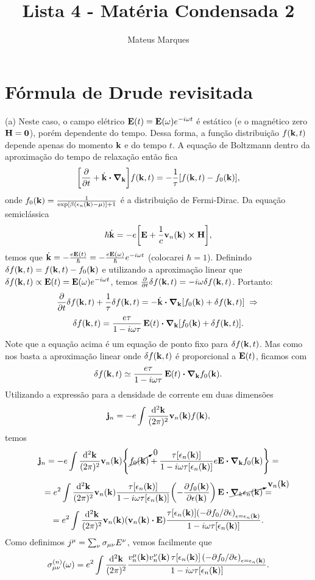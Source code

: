 \documentclass[a4paper,10pt]{article}
\title{\Huge{\textbf{Lista 4 - Matéria Condensada 2}}}
\author{Mateus Marques}
\begin{document}
\maketitle

\section{Fórmula de Drude revisitada}

(a) Neste caso, o campo elétrico $\vb{E}(t) = \vb{E}(\omega) e^{-i\omega t}$ é estático (e o magnético zero $\vb{H}=\vb{0}$), porém dependente do tempo. Dessa forma, a função distribuição $f(\vb{k}, t)$ depende apenas do momento $\vb{k}$ e do tempo $t$. A equação de Boltzmann dentro da aproximação do tempo de relaxação então fica
$$
\qty[\pdv{t} + \dot{\k} \vdot \grad_{\k}] f(\k, t) =
-\frac{1}{\tau} \qty[f(\k,t) - f_0(\k)],
$$
onde $f_0(\vb{k}) = \frac{1}{\exp[\beta(\epsilon_n(\vb{k})-\mu)] + 1}$ é a distribuição de Fermi-Dirac. Da equação semiclássica
$$
\hbar \dot{\k} = -e \qty[\E + \frac{1}{c} \v_n(\k) \cp \vb{H}],
$$
temos que $\dot{\vb{k}} = - \frac{e \vb{E}(t)}{\hbar} = -\frac{e \vb{E}(\omega)}{\hbar} e^{-i\omega t}$ (colocarei $\hbar=1$). Definindo $\delta f(\vb{k},t) = f(\vb{k},t) - f_0(\vb{k})$ e utilizando a aproximação linear que $\delta f(\vb{k},t) \propto \vb{E}(t) = \vb{E}(\omega) e^{-i\omega t}$, temos $\pdv{t} \delta f(\vb{k},t) = - i\omega \delta f(\vb{k},t)$. Portanto:
$$
\pdv{t}\delta f(\k,t) + \frac{1}{\tau} \delta f(\k, t) =  - \dot{\k} \vdot \grad_{\k}  [f_0(\k) + \delta f(\k, t) ] \implies
$$
$$
\delta f(\k,t) = \frac{e \tau}{1-i\omega \tau} \, \E(t) \vdot \grad_{\k}  [ f_0(\k) + \delta f(\k, t) ].
$$
Note que a equação acima é um equação de ponto fixo para $\delta f(\vb{k},t)$. Mas como nos basta a aproximação linear onde $\delta f(\vb{k},t)$ é proporcional a $\vb{E}(t)$, ficamos com
$$
\delta f(\k,t) \simeq \frac{e \tau}{1-i\omega \tau} \, \E(t) \vdot \grad_{\k}  f_0(\k).
$$
Utilizando a expressão para a densidade de corrente em duas dimensões
$$
\vb{j}_n = -e \int \frac{\dd[2]{\vb{k}}}{(2\pi)^2} \vb{v}_n(\vb{k}) f(\vb{k}),
$$
temos
$$
\vb{j}_n = -e \int \frac{\dd[2]{\k}}{(2\pi)^2} \v_n(\k)
\qty{ \cancelto{0}{f_0(\k)} +
\frac{\tau[\eps_n(\k)]}{1-i\omega \tau[\eps_n(\k)]} e\E \vdot \grad_{\k} f_0(\k)} =
$$
$$
= e^2 \int \frac{\dd[2]{\k}}{(2\pi)^2} \v_n(\k)
\frac{\tau[\eps_n(\k)]}{1-i\omega \tau[\eps_n(\k)]} \qty(-\pdv{f_0(\k)}{\eps(\k)}) \, \E \vdot
\cancelto{\v_n(\k)}{\grad_k \eps_n(\k)} =
$$
$$
= e^2 \int \frac{\dd[2]{\k}}{(2\pi)^2} \v_n(\k) ( \v_n(\k) \vdot \E )
\frac{\tau[\eps_n(\k)]\qty(-\partial f_0 / \partial \eps)_{\eps = \eps_n(\k)}}{1-i\omega \tau[\eps_n(\k)]}.
$$
Como definimos $j^{\mu} = \sum_{\nu} \sigma_{\mu\nu} E^{\nu}$, vemos facilmente que
\begin{equation} \label{eq:cond}
\sigma_{\mu\nu}^{(n)}(\omega) = e^2 \int \frac{\dd[2]{\vb{k}}}{(2\pi)^2}
\frac{v_n^{\mu}(\vb{k}) v_n^{\nu}(\vb{k}) \, \tau[\epsilon_n(\vb{k})] \, \qty(-\partial f_0 / \partial \epsilon)_{\epsilon = \epsilon_n(\vb{k})}}
{1-i\omega \tau[\epsilon_n(\vb{k})]}.
\end{equation}
\end{document}
